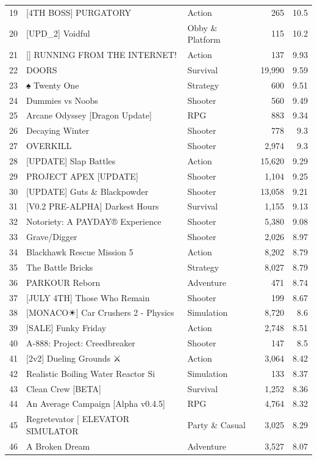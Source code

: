 \documentclass[10pt]{article}
\begin{document}
\begin{longtable}{r l l r r}
19 & [4TH BOSS] PURGATORY & Action & 265 & 10.5 \\
20 & [UPD\_2] Voidful & Obby \& Platform & 115 & 10.2 \\
21 & [] RUNNING FROM THE INTERNET! & Action & 137 & 9.93 \\
22 & DOORS & Survival & 19,990 & 9.59 \\
23 & ♠ Twenty One & Strategy & 600 & 9.51 \\
24 & Dummies vs Noobs & Shooter & 560 & 9.49 \\
25 & Arcane Odyssey [Dragon Update] & RPG & 883 & 9.34 \\
26 & Decaying Winter & Shooter & 778 & 9.3 \\
27 & OVERKILL & Shooter & 2,974 & 9.3 \\
28 & [UPDATE] Slap Battles & Action & 15,620 & 9.29 \\
29 & PROJECT APEX [UPDATE] & Shooter & 1,104 & 9.25 \\
30 & [UPDATE] Guts \& Blackpowder & Shooter & 13,058 & 9.21 \\
31 & [V0.2 PRE-ALPHA] Darkest Hours & Survival & 1,155 & 9.13 \\
32 & Notoriety: A PAYDAY® Experience & Shooter & 5,380 & 9.08 \\
33 & Grave/Digger & Shooter & 2,026 & 8.97 \\
34 & Blackhawk Rescue Mission 5 & Action & 8,202 & 8.79 \\
35 & The Battle Bricks & Strategy & 8,027 & 8.79 \\
36 & PARKOUR Reborn & Adventure & 471 & 8.74 \\
37 & [JULY 4TH] Those Who Remain & Shooter & 199 & 8.67 \\
38 & [MONACO☀] Car Crushers 2 - Physics & Simulation & 8,720 & 8.6 \\
39 & [SALE] Funky Friday & Action & 2,748 & 8.51 \\
40 & A-888: Project: Creedbreaker & Shooter & 147 & 8.5 \\
41 & [2v2] Dueling Grounds ⚔ & Action & 3,064 & 8.42 \\
42 & Realistic Boiling Water Reactor Si & Simulation & 133 & 8.37 \\
43 & Clean Crew  [BETA] & Survival & 1,252 & 8.36 \\
44 & An Average Campaign [Alpha v0.4.5] & RPG & 4,764 & 8.32 \\
45 & Regretevator [ ELEVATOR SIMULATOR  & Party \& Casual & 3,025 & 8.29 \\
46 & A Broken Dream & Adventure & 3,527 & 8.07 \\

\end{longtable}
\end{document}
